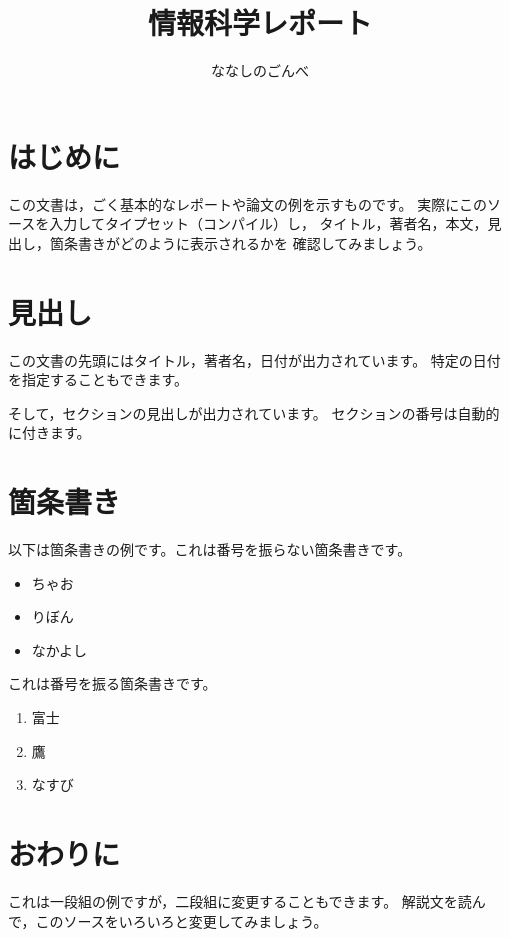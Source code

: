 \documentclass[uplatex,dvipdfmx]{jsarticle}
\begin{document}
\title{情報科学レポート}
\author{ななしのごんべ}
\maketitle

\section{はじめに}
	この文書は，ごく基本的なレポートや論文の例を示すものです。
	実際にこのソースを入力してタイプセット（コンパイル）し，
	タイトル，著者名，本文，見出し，箇条書きがどのように表示されるかを
	確認してみましょう。

\section{見出し}
	この文書の先頭にはタイトル，著者名，日付が出力されています。
	特定の日付を指定することもできます。

	そして，セクションの見出しが出力されています。
	セクションの番号は自動的に付きます。

\section{箇条書き}
	以下は箇条書きの例です。これは番号を振らない箇条書きです。
	\begin{itemize}
		\item ちゃお
		\item りぼん
		\item なかよし
	\end{itemize}
	これは番号を振る箇条書きです。
	\begin{enumerate}
		\item 富士
		\item 鷹
		\item なすび
	\end{enumerate}

\section{おわりに}
	これは一段組の例ですが，二段組に変更することもできます。
	解説文を読んで，このソースをいろいろと変更してみましょう。
\end{document}
